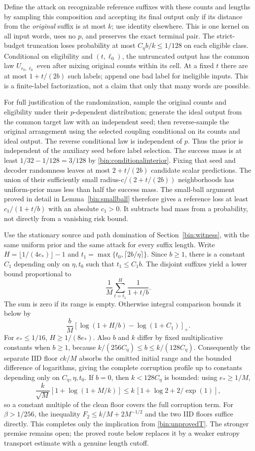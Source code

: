 Define the attack on recognizable reference suffixes with these counts and lengths by sampling this composition and accepting its final output only if its distance from the \emph{original} suffix is at most $k$; use identity elsewhere. This is one kernel on all input words, uses no $p$, and preserves the exact terminal pair. The strict-budget truncation loses probability at most $C_\eta b/k\le1/128$ on each eligible class. Conditional on eligibility and $(t,\ell_0)$, the untruncated output has the common law $U_{r_0,\ell_0}$ even after mixing original counts within its cell. At a fixed $t$ there are at most $1+t/(2b)$ such labels; append one bad label for ineligible inputs. This is a finite-label factorization, not a claim that only that many words are possible.

For full justification of the randomization, sample the original counts and eligibility under their $p$-dependent distribution; generate the ideal output from the common target law with an independent seed; then reverse-sample the original arrangement using the selected coupling conditional on its counts and ideal output. The reverse conditional law is independent of $p$. Thus the prior is independent of the auxiliary seed before label selection. The success mass is at least $1/32-1/128=3/128$ by \eqref{bin:conditionalinterior}. Fixing that seed and decoder randomness leaves at most $2+t/(2b)$ candidate scalar predictions. The union of their sufficiently small radius-$c/(2+t/(2b))$ neighborhoods has uniform-prior mass less than half the success mass. The small-ball argument proved in detail in Lemma~\ref{bin:smallball} therefore gives a reference loss at least $c_1/(1+t/b)$ with an absolute $c_1>0$. It subtracts bad mass from a probability, not directly from a vanishing risk bound.

Use the stationary source and path domination of Section~\ref{bin:witness}, with the same uniform prior and the same attack for every suffix length. Write $H=\lfloor1/(4e_*)\rfloor-1$ and $t_1=\max\{t_0,\lceil2b/\eta\rceil\}$. Since $b\ge1$, there is a constant $C_1$ depending only on $\eta,t_0$ such that $t_1\le C_1b$. The disjoint suffixes yield a lower bound proportional to
\[
 \frac1M\sum_{t=t_1}^{H}\frac1{1+t/b}.
\]
The sum is zero if its range is empty. Otherwise integral comparison bounds it below by
\[
 \frac bM\left[\log(1+H/b)-\log(1+C_1)\right]_+.
\]
For $e_*\le1/16$, $H\ge1/(8e_*)$. Also $b$ and $k$ differ by fixed multiplicative constants when $b\ge1$, because $k/(256C_\eta)\le b\le k/(128C_\eta)$. Consequently the separate IID floor $ck/M$ absorbs the omitted initial range and the bounded difference of logarithms, giving the complete corruption profile up to constants depending only on $C_\eta,\eta,t_0$. If $b=0$, then $k<128C_\eta$ is bounded: using $e_*\ge1/M$,
\[
 \frac{k}{\sqrt M}[1+\log(1+M/k)]
 \le k\,[1+\log2+2/\exp(1)],
\]
so a constant multiple of the clean floor covers the full corruption term. For $\beta>1/256$, the inequality $F_2\le k/M+2M^{-1/2}$ and the two IID floors suffice directly. This completes only the implication from \eqref{bin:unprovedT}. The stronger premise remains open; the proved route below replaces it by a weaker entropy transport estimate with a genuine length cutoff.

